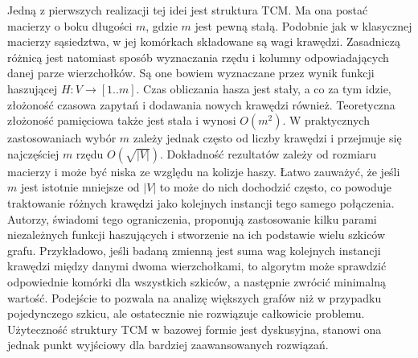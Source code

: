     Jedną z pierwszych realizacji tej idei jest struktura TCM\cite{Tang_Chen_Mitra_2016}. Ma ona postać macierzy o boku długości $m$, gdzie $m$ jest pewną stałą. Podobnie jak w klasycznej macierzy sąsiedztwa, w jej komórkach składowane są wagi krawędzi. Zasadniczą różnicą jest natomiast sposób wyznaczania rzędu i kolumny odpowiadających danej parze wierzchołków. Są one bowiem wyznaczane przez wynik funkcji haszującej $H : V \rightarrow [1..m]$. Czas obliczania hasza jest stały, a co za tym idzie, złożoność czasowa zapytań i dodawania nowych krawędzi również. Teoretyczna złożoność pamięciowa także jest stała i wynosi $O(m^2)$. W praktycznych zastosowaniach wybór $m$ zależy jednak często od liczby krawędzi i przejmuje się najczęściej $m$ rzędu $O(\sqrt{|V|})$. Dokładność rezultatów zależy od rozmiaru macierzy i może być niska ze względu na kolizje haszy. Łatwo zauważyć, że jeśli $m$ jest istotnie mniejsze od $|V|$ to może do nich dochodzić często, co powoduje traktowanie różnych krawędzi jako kolejnych instancji tego samego połączenia. Autorzy, świadomi tego ograniczenia, proponują zastosowanie kilku parami niezależnych funkcji haszujących i stworzenie na ich podstawie wielu szkiców grafu. Przykładowo, jeśli badaną zmienną jest suma wag kolejnych instancji krawędzi między danymi dwoma wierzchołkami, to algorytm może sprawdzić odpowiednie komórki dla wszystkich szkiców, a następnie zwrócić minimalną wartość. Podejście to pozwala na analizę większych grafów niż w przypadku pojedynczego szkicu, ale ostatecznie nie rozwiązuje całkowicie problemu. Użyteczność struktury TCM w bazowej formie jest dyskusyjna, stanowi ona jednak punkt wyjściowy dla bardziej zaawansowanych rozwiązań.

